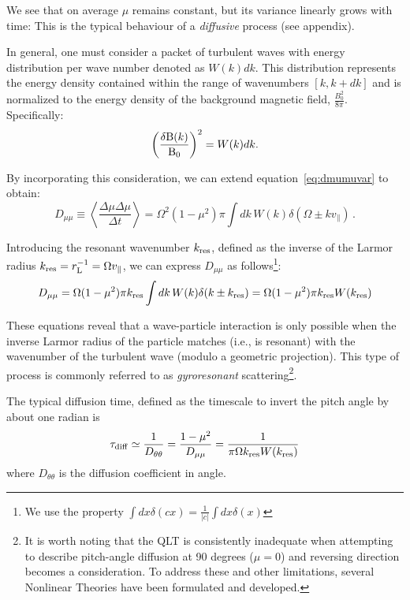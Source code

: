 We see that on average \( \mu \) remains constant, but its variance linearly grows with time: This is the typical behaviour of a \emph{diffusive} process (see appendix).

In general, one must consider a packet of turbulent waves with energy distribution per wave number denoted as $W(k) dk$. This distribution represents the energy density contained within the range of wavenumbers $[k, k + dk]$ and is normalized to the energy density of the background magnetic field, \( \frac{B_0^2}{8\pi} \). Specifically:
%
\begin{equation}
\left( \frac{\delta {\rm B}(k)}{{\rm B}_0} \right)^2 = W(k) dk.
\end{equation}

By incorporating this consideration, we can extend equation~\eqref{eq:dmumuvar} to obtain:
%
\begin{equation}
D_{\mu \mu} \equiv \left\langle \frac{\Delta \mu \Delta \mu}{\Delta t} \right\rangle = \Omega^2 (1 - \mu^2) \pi \int dk \, W(k) \delta(\Omega \pm k v_{\parallel}) \, .
\end{equation}

Introducing the resonant wavenumber \( k_{\rm res} \), defined as the inverse of the Larmor radius \( k_{\rm res} = r_{\rm L}^{-1} = \Omega v_\| \), we can express $D_{\mu \mu}$ as follows\footnote{We use the property $\int dx \delta (c x) = \frac{1}{|c|} \int dx \delta (x)$}:
%
\begin{equation} 
D_{\mu \mu} = \Omega (1 - \mu^2) \pi k_{\mathrm{res}} \int dk \, W(k) \delta(k \pm k_{\mathrm{res}}) = \Omega (1 - \mu^2) \pi k_{\mathrm{res}} W(k_{\rm res})
\end{equation}

These equations reveal that a wave-particle interaction is only possible when the inverse Larmor radius of the particle matches (i.e., is resonant) with the wavenumber of the turbulent wave (modulo a geometric projection). 
%
This type of process is commonly referred to as \emph{gyroresonant} scattering\footnote{It is worth noting that the QLT is consistently inadequate when attempting to describe pitch-angle diffusion at 90 degrees ($\mu = 0$) and reversing direction becomes a consideration. To address these and other limitations, several Nonlinear Theories have been formulated and developed.}.

The typical diffusion time, defined as the timescale to invert the pitch angle by about one radian is
%
\begin{equation}
\tau_{\rm diff} \simeq \frac{1}{D_{\theta\theta}} = \frac{1-\mu^2}{D_{\mu\mu}} = \frac{1}{\pi \Omega k_{\rm res} W(k_{\rm res})}
\end{equation}
%
where $D_{\theta\theta}$ is the diffusion coefficient in angle.

